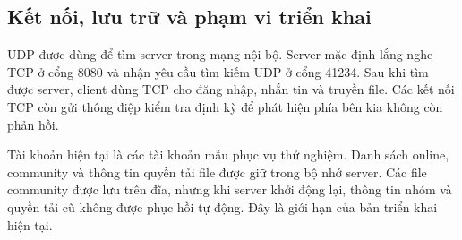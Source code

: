 \subsection{Kết nối, lưu trữ và phạm vi triển khai}

UDP được dùng để tìm server trong mạng nội bộ. Server mặc định lắng nghe TCP ở
cổng 8080 và nhận yêu cầu tìm kiếm UDP ở cổng 41234. Sau khi tìm được server,
client dùng TCP cho đăng nhập, nhắn tin và truyền file. Các kết nối TCP còn gửi
thông điệp kiểm tra định kỳ để phát hiện phía bên kia không còn phản hồi.

Tài khoản hiện tại là các tài khoản mẫu phục vụ thử nghiệm. Danh sách online,
community và thông tin quyền tải file được giữ trong bộ nhớ server. Các file
community được lưu trên đĩa, nhưng khi server khởi động lại, thông tin nhóm và
quyền tải cũ không được phục hồi tự động. Đây là giới hạn của bản triển khai hiện tại.

\endgroup
